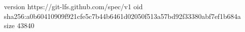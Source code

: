 version https://git-lfs.github.com/spec/v1
oid sha256:a0b60410909f921cfe5c7b44b6461d02050f513a57bd92f33380abf7ef1b684a
size 43840
